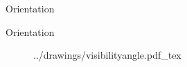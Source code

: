 \begin{frame}{Orientation}{}
\centering
\begin{figure}[!htb]%
\label{fig:prototype2-app-screenshots}
\end{figure}
\end{frame}

\begin{frame}{Orientation}{}
\centering
\begin{figure}[!htb]
    \centering
    \def\svgwidth{0.7\textwidth}
    {../drawings/visibilityangle.pdf_tex}
\label{fig:visibilityangle}
\end{figure}
\end{frame}